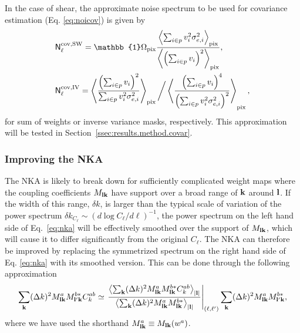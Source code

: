 \documentclass[a4paper,11pt]{article}
\begin{document}
        In the case of shear, the approximate noise spectrum to be used for covariance estimation (Eq. \ref{eq:noicov}) is given by
        \begin{align}
          &{\sf N}_\ell^{\rm cov,SW}=\mathbb{1}\Omega_{\rm pix}\frac{\left\langle \sum_{i\in p}v_i^2\sigma_{e,i}^2\right\rangle_{\rm pix}}{\left\langle \left(\sum_{i\in p}v_i\right)^2\right\rangle_{\rm pix}}, \label{eq:noicov_shear1}
          \\
          &{\sf N}_\ell^{\rm cov, IV}=\left\langle \frac{\left(\sum_{i\in p}v_i\right)^2}{\sum_{i\in p} v_i^2\sigma_{e,i}^2}\right\rangle_{\rm pix}\bigg/\left\langle \frac{\left(\sum_{i\in p}v_i\right)^4}{\left(\sum_{i\in p} v_i^2\sigma_{e,i}^2\right)^2}\right\rangle_{\rm pix},\label{eq:noicov_shear2}
        \end{align}
      for sum of weights or inverse variance masks, respectively. This approximation will be tested in Section~\ref{ssec:results.method.covar}.

      \subsubsection{Improving the NKA}\label{sssec:pcl.covar.nkaplus}
        The NKA is likely to break down for sufficiently complicated weight maps where the coupling coefficients $M_{{\bf l}{\bf k}}$ have support over a broad range of ${\bf k}$ around ${\bf l}$. If the width of this range, $\delta k$, is larger than the typical scale of variation of the power spectrum $\delta k_{C_\ell}\sim (d\log C_\ell/d\ell)^{-1}$, the power spectrum on the left hand side of Eq.~\ref{eq:nka} will be effectively smoothed over the support of $M_{{\bf l}{\bf k}}$, which will cause it to differ significantly from the original $C_\ell$. The NKA can therefore be improved by replacing the symmetrized spectrum on the right hand side of Eq. \ref{eq:nka} with its smoothed version. This can be done through the following approximation
        \begin{equation}\label{eq:nka_plus}
           \sum_{\bf k}(\Delta k)^2M^a_{{\bf l}{\bf k}}M^{b*}_{{\bf l}'{\bf k}}C^{ab}_k\simeq \left.\frac{\left\langle\sum_{\bf k}(\Delta k)^2M^a_{{\bf l}{\bf k}}M^{b*}_{{\bf l}{\bf k}}C^{ab}_k\right\rangle_{|{\bf l}|}}{\left\langle\sum_{\bf k}(\Delta k)^2M^a_{{\bf l}{\bf k}}M^{b*}_{{\bf l}{\bf k}}\right\rangle_{|{\bf l}|}}\right|_{(\ell,\ell')}\sum_{\bf k}(\Delta k)^2M^a_{{\bf l}{\bf k}}M^{b*}_{{\bf l}'{\bf k}},
        \end{equation}
        where we have used the shorthand $M^a_{{\bf l}{\bf k}}\equiv M_{{\bf l}{\bf k}}(w^a)$.
        
\end{document}
